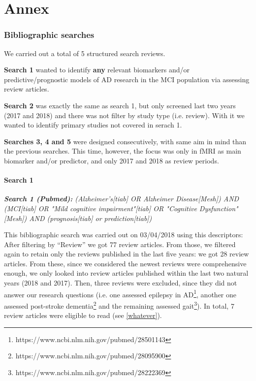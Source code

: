 \part{Annex}

\section{Bibliographic searches}\label{Prognosis Alzheimer cerca}

We carried out a total of 5 structured search reviews. 

\textbf{Search 1} wanted to identify \textbf{any} relevant biomarkers and/or predictive/prognostic models of AD research in the MCI population via assessing review articles.

\textbf{Search 2} was exactly the same as search 1, but only screened last two years (2017 and 2018) and there was not filter by study type (i.e. review). With it we wanted to identify primary studies not covered in serach 1.

\textbf{Searches 3, 4 and 5} were designed consecutively, with same aim in mind than the previous searches. This time, however, the focus was only in fMRI as main biomarker and/or predictor, and only 2017 and 2018 as review periods.

\subsection{Search 1} \label{search1_AD_reviews}


\textit{\textbf{Search 1 (Pubmed):} (Alzheimer's[tiab] OR Alzheimer Disease[Mesh]) AND (MCI[tiab] OR "Mild cognitive impairment"[tiab] OR "Cognitive Dysfunction"[Mesh]) AND (prognosis[tiab] or prediction[tiab])}

This bibliographic search was carried out on 03/04/2018 using this descriptors: After filtering by ``Review'' we got 77 review articles. From those, we filtered again to retain only the reviews published in the last five years: we got 28 review articles. From these, since we considered the newest reviews were comprehensive enough, we only looked into review articles published within the last two natural years (2018 and 2017). Then, three reviews were excluded, since they did not answer our research questions (i.e. one assessed epilepsy in AD\footnote{https://www.ncbi.nlm.nih.gov/pubmed/28501143}, another one assessed post-stroke dementia\footnote{https://www.ncbi.nlm.nih.gov/pubmed/28095900} and the remaining assessed gait\footnote{https://www.ncbi.nlm.nih.gov/pubmed/28222369}). In total, 7 review articles were eligible to read (see \ref{whatever}\cite{Liu201856,Henriques2018,Martinez2017,Sarica2017,Dallora2017,Rathore2017530,Herukka2017285}).
\FloatBarrier

